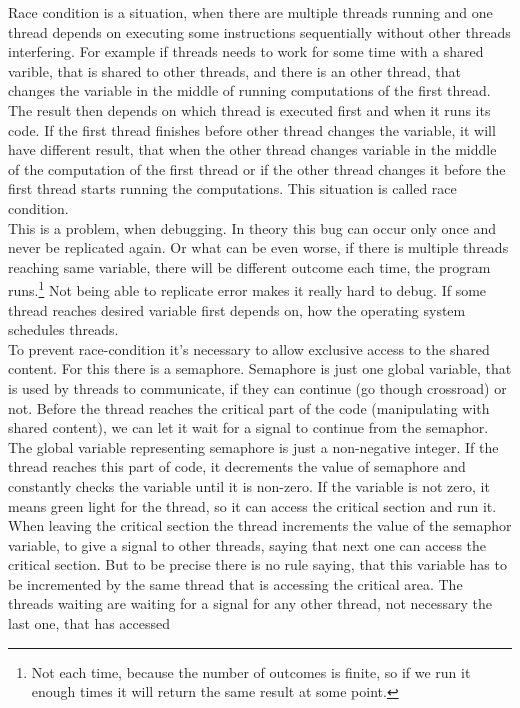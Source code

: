 \documentclass[a4paper]{article}
\begin{document}
Race condition is a situation, when there are multiple threads running and one thread
depends on executing some instructions sequentially without other threads interfering.
For example if threads needs to work for some time with a shared varible, that is 
shared to other threads, and there is an other thread, that changes the variable in
the middle of running computations of the first thread. The result then depends on which
thread is executed first and when it runs its code. If the first thread finishes before
other thread changes the variable, it will have different result, that when the other thread
changes variable in the middle of the computation of the first thread  or if the
other thread changes it before the first thread starts running the computations. This
situation is called race condition.\\
This is a problem, when debugging. In theory this bug can occur only once and never be replicated
again. Or what can be even worse, if there is multiple threads reaching same variable,
there will be different outcome each time, the program runs.\footnote{Not 
each time, because the number of outcomes is finite, so if we run it enough times
it will return the same result at some point.}
Not being able to replicate error makes it really hard to debug. If some thread 
reaches desired variable first depends on, how the operating system schedules threads. \\
To prevent race-condition it's necessary to allow exclusive access to the shared content.
For this there is a semaphore. Semaphore is just
one global variable, that is used by threads to communicate, if they can continue (go
though crossroad) or not. Before the thread reaches the critical part of the code
(manipulating with shared content),
we can let it wait for a signal to continue from the semaphor. The global variable representing
semaphore is just a non-negative integer. If the thread reaches this part
of code, it decrements the value of semaphore and constantly
checks the variable until it is non-zero. If the variable is not zero, it means green light
for the thread, so it can access the critical section and run it. When leaving the critical section 
the thread increments the value of the semaphor variable, to give a signal to other threads, 
saying that next 
one can access the critical section. But to be precise there is no rule saying, that this
variable has to be incremented by the same thread that is accessing the critical area. The threads
waiting are waiting for a signal for any other thread, not necessary the last one, that has accessed
\end{document}
